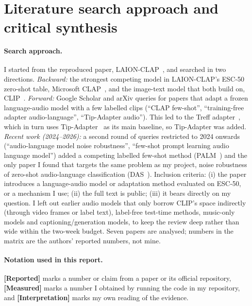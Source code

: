 \section{Literature search approach and critical synthesis}
\label{sec:lit}

\paragraph{Search approach.}
I started from the reproduced paper, LAION-CLAP~\cite{wu2023laionclap}, and searched in two directions.
\emph{Backward:} the strongest competing model in LAION-CLAP's ESC-50 zero-shot table, Microsoft CLAP~\cite{elizalde2023clap},
and the image-text model that both build on, CLIP~\cite{radford2021clip}.
\emph{Forward:} Google Scholar and arXiv queries for papers that adapt a frozen language-audio model with a few labelled clips
(``CLAP few-shot'', ``training-free adapter audio-language'', ``Tip-Adapter audio''). This led to the
Treff adapter~\cite{liang2023treff}, which in turn uses Tip-Adapter~\cite{zhang2022tip} as its main baseline, so Tip-Adapter was added.
\emph{Recent work (2024--2026):} a second round of queries restricted to 2024 onwards
(``audio-language model noise robustness'', ``few-shot prompt learning audio language model'')
added a competing labelled few-shot method (PALM~\cite{hanif2024palm})
and the only paper I found that targets the same problem as my project, noise robustness of zero-shot audio-language classification (DAS~\cite{vo2026das}).
Inclusion criteria: (i) the paper introduces a language-audio model or adaptation method evaluated on ESC-50, or a mechanism I use; (ii) the full text is public; (iii) it bears directly on my question.
I left out earlier audio models that only borrow CLIP's space indirectly (through video frames or label text), label-free test-time methods, music-only models and captioning/generation models,
to keep the review deep rather than wide within the two-week budget. Seven papers are analysed; numbers in the matrix are the authors' reported numbers, not mine.

\paragraph{Notation used in this report.}
\textbf{[Reported]} marks a number or claim from a paper or its official repository,
\textbf{[Measured]} marks a number I obtained by running the code in my repository, and
\textbf{[Interpretation]} marks my own reading of the evidence.


